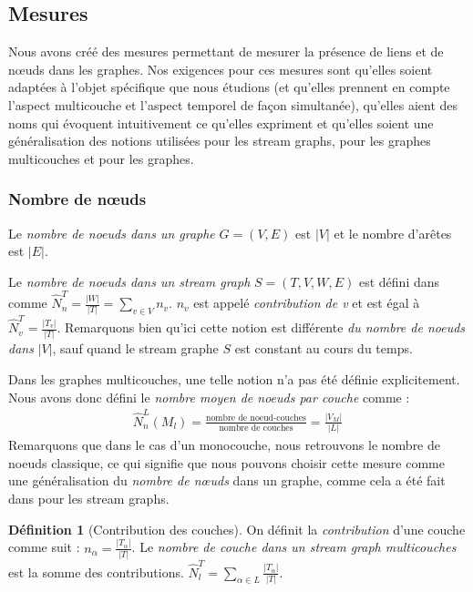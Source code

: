 \documentclass[11pt,a4paper]{article}
\theoremstyle{definition}
\newtheorem{defn}{Définition}
\theoremstyle{remark}
\theoremstyle{remark}
\begin{document}
\subsection{Mesures}


Nous avons créé des mesures permettant de mesurer la présence de liens et de nœuds dans les graphes. Nos exigences pour ces mesures sont qu'elles soient adaptées à l'objet spécifique que nous étudions (et qu'elles prennent en compte l'aspect multicouche et l'aspect temporel de façon simultanée), qu'elles aient des noms qui évoquent intuitivement ce qu'elles expriment et qu'elles soient une généralisation des notions utilisées pour les stream graphs, pour les graphes multicouches et pour les graphes.

	\subsubsection{Nombre de nœuds}
	Le {\em nombre de noeuds dans un graphe} $G=(V,E)$ est $|V|$ et le nombre d'arêtes est $|E|$.
	
	Le {\em nombre de noeuds dans un stream graph} $S=(T,V,W,E)$ est défini dans \cite{stream} comme $\hat{N}^T_n=\frac{|W|}{|T|}=\sum_{v\in V} n_v$. $n_v$ est appelé {\em contribution de v} et est égal à $\hat{N}^T_v=\frac{|T_v|}{|T|}$. Remarquons bien qu'ici cette notion est différente {\em du nombre de noeuds dans} $|V|$, sauf quand le stream graphe $S$ est constant au cours du temps.
	\newline
	
	Dans les graphes multicouches, une telle notion n'a pas été définie explicitement.
	Nous avons donc défini le {\em nombre moyen de noeuds par couche} comme :
	\begin{align*}
		\hat{N}_n^L(M_l) = \frac{\text{nombre de noeud-couches}}{\text{nombre de couches}}=\frac{|V_M|}{|L|}
	\end{align*}	    
	Remarquons que dans le cas d'un monocouche, nous retrouvons le nombre de noeuds classique, ce qui signifie que nous pouvons choisir cette mesure comme une généralisation du {\em nombre de nœuds} dans un graphe, comme cela a été fait dans \cite{stream} pour les stream graphs.
		
	
	\begin{defn}[Contribution des couches]
	On définit la {\em contribution} d'une couche comme suit : $n_\alpha = \frac{|T_{\alpha}|}{|T|}$. Le {\em nombre de couche dans un stream graph multicouches} est la somme des contributions. $\hat{N}^T_l = \sum_{\alpha \in L}\frac{ |T_{\alpha}|}{|T|}$.
    \end{defn}
	
\end{document}

